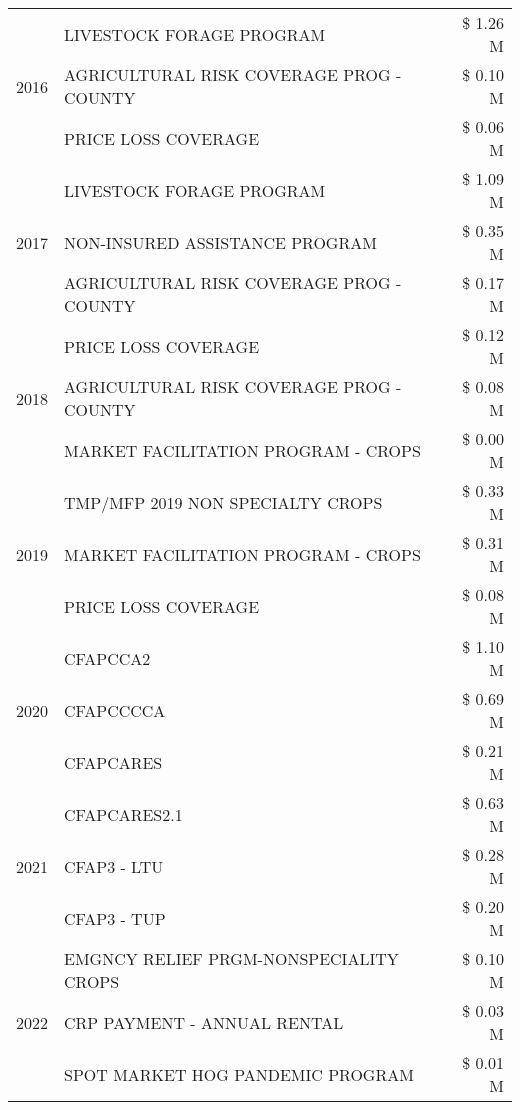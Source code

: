 \begin{tabular}{llr}
\cline{1-3}
\multirow[t]{3}{*}{2016} & LIVESTOCK FORAGE PROGRAM & \$ 1.26 M \\
 & AGRICULTURAL RISK COVERAGE PROG - COUNTY & \$ 0.10 M \\
 & PRICE LOSS COVERAGE & \$ 0.06 M \\
\cline{1-3}
\multirow[t]{3}{*}{2017} & LIVESTOCK FORAGE PROGRAM & \$ 1.09 M \\
 & NON-INSURED ASSISTANCE PROGRAM & \$ 0.35 M \\
 & AGRICULTURAL RISK COVERAGE PROG - COUNTY & \$ 0.17 M \\
\cline{1-3}
\multirow[t]{3}{*}{2018} & PRICE LOSS COVERAGE & \$ 0.12 M \\
 & AGRICULTURAL RISK COVERAGE PROG - COUNTY & \$ 0.08 M \\
 & MARKET FACILITATION PROGRAM - CROPS & \$ 0.00 M \\
\cline{1-3}
\multirow[t]{3}{*}{2019} & TMP/MFP 2019 NON SPECIALTY CROPS & \$ 0.33 M \\
 & MARKET FACILITATION PROGRAM - CROPS & \$ 0.31 M \\
 & PRICE LOSS COVERAGE & \$ 0.08 M \\
\cline{1-3}
\multirow[t]{3}{*}{2020} & CFAPCCA2 & \$ 1.10 M \\
 & CFAPCCCCA & \$ 0.69 M \\
 & CFAPCARES & \$ 0.21 M \\
\cline{1-3}
\multirow[t]{3}{*}{2021} & CFAPCARES2.1 & \$ 0.63 M \\
 & CFAP3 - LTU & \$ 0.28 M \\
 & CFAP3 - TUP & \$ 0.20 M \\
\cline{1-3}
\multirow[t]{3}{*}{2022} & EMGNCY RELIEF PRGM-NONSPECIALITY CROPS & \$ 0.10 M \\
 & CRP PAYMENT - ANNUAL RENTAL & \$ 0.03 M \\
 & SPOT MARKET HOG PANDEMIC PROGRAM & \$ 0.01 M \\
\cline{1-3}
\bottomrule
\end{tabular}
